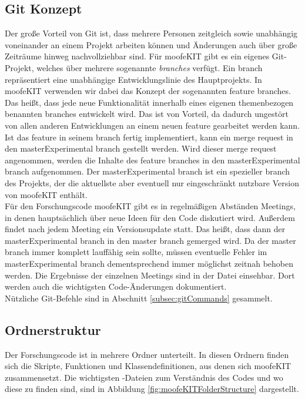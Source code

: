 \documentclass[12pt,bibstyle=none,pagenumberinfooter]{ifmdocument}
\begin{document}
\subsection{Git Konzept}
Der große Vorteil von Git ist, dass mehrere Personen zeitgleich sowie unabh\"angig voneinander an einem Projekt arbeiten können und Änderungen auch über große Zeiträume hinweg nachvollziehbar sind. Für moofeKIT gibt es ein eigenes Git-Projekt, welches über mehrere sogenannte \textit{branches} verfügt. Ein branch repräsentiert eine unabhängige Entwicklungslinie des Hauptprojekts. In moofeKIT verwenden wir dabei das Konzept der sogenannten feature branches. Das heißt, dass jede neue Funktionalität innerhalb eines eigenen themenbezogen benannten branches entwickelt wird. Das ist von Vorteil, da dadurch ungest\"ort von allen anderen Entwicklungen an einem neuen feature gearbeitet werden kann. Ist das feature in seinem branch fertig implementiert, kann ein merge request in den masterExperimental branch gestellt werden. Wird dieser merge request angenommen, werden die Inhalte des feature branches in den masterExperimental branch aufgenommen. Der masterExperimental branch ist ein spezieller branch des Projekts, der die aktuellste aber eventuell nur eingeschränkt nutzbare Version von moofeKIT enthält.\\
F\"ur den Forschungscode moofeKIT gibt es in regelmäßigen Abständen Meetings, in denen hauptsächlich über neue Ideen für den Code diskutiert wird. Außerdem findet nach jedem Meeting ein Versionsupdate statt. Das heißt, dass dann der masterExperimental branch in den master branch gemerged wird. Da der master branch immer komplett lauffähig sein sollte, müssen eventuelle Fehler im masterExperimental branch dementsprechend immer möglichst zeitnah behoben werden. Die Ergebnisse der einzelnen Meetings sind in der Datei  einsehbar. Dort werden auch die wichtigsten Code-Änderungen dokumentiert.\\
Nützliche Git-Befehle sind in Abschnitt \ref{subsec:gitCommands} gesammelt.
 

\subsection{Ordnerstruktur}
Der Forschungscode ist in mehrere Ordner unterteilt. In diesen Ordnern finden sich die Skripte, Funktionen und Klassendefinitionen, aus denen sich moofeKIT zusammensetzt. Die wichtigsten \matlab -Dateien zum Verst\"andnis des Codes und wo diese zu finden sind, sind in Abbildung \ref{fig:moofeKITFolderStructure} dargestellt. 
\end{document}
